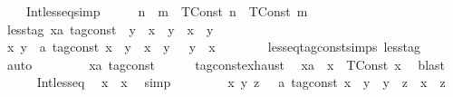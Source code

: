 \begin{isabellebody}
\ \ \ \ Int{\isacharunderscore}less{\isacharunderscore}eq{\isacharbrackleft}simp{\isacharbrackright}{\isacharcolon}\ \ \ \ \ \ {\isacartoucheopen}n\ {\isasymle}\ m\ {\isasymLongrightarrow}\ {\isacharparenleft}TConst\ n{\isacharparenright}\ {\isasymle}\ {\isacharparenleft}TConst\ m{\isacharparenright}{\isacartoucheclose}\isanewline
\isanewline
\ \ \isamarkupfalse%
\ less{\isacharunderscore}tag{\isacharcolon}\ {\isacartoucheopen}{\isacharparenleft}x{\isacharcolon}{\isacharcolon}{\isacharprime}a\ tag{\isacharunderscore}const{\isacharparenright}\ {\isacharless}\ y\ {\isasymlongleftrightarrow}\ {\isacharparenleft}x\ {\isasymle}\ y{\isacharparenright}\ {\isasymand}\ {\isacharparenleft}x\ {\isasymnoteq}\ y{\isacharparenright}{\isacartoucheclose}\isanewline
\isanewline
\ \ \isamarkupfalse%
%
\isadelimproof
\ %
\endisadelimproof
%
\isatagproof
{}\isamarkupfalse%
\isanewline
\ \ \ \ \isamarkupfalse%
\ {\isacartoucheopen}{\isasymAnd}x\ y\ {\isacharcolon}{\isacharcolon}\ {\isacharprime}a\ tag{\isacharunderscore}const{\isachardot}\ {\isacharparenleft}x\ {\isacharless}\ y{\isacharparenright}\ {\isacharequal}\ {\isacharparenleft}x\ {\isasymle}\ y\ {\isasymand}\ {\isasymnot}\ y\ {\isasymle}\ x{\isacharparenright}{\isacartoucheclose}\isanewline
\ \ \ \ \ \ \isamarkupfalse%
\ less{\isacharunderscore}eq{\isacharunderscore}tag{\isacharunderscore}const{\isachardot}simps\ less{\isacharunderscore}tag\ \isamarkupfalse%
\ auto\isanewline
\ \ \isamarkupfalse%
\isanewline
\ \ \ \ \isamarkupfalse%
\ x{\isacharcolon}{\isacharcolon}{\isacartoucheopen}{\isacharprime}a\ tag{\isacharunderscore}const{\isacartoucheclose}\isanewline
\ \ \ \ \isamarkupfalse%
\ tag{\isacharunderscore}const{\isachardot}exhaust\ \isamarkupfalse%
\ xa\ \ {\isacartoucheopen}x\ {\isacharequal}\ TConst\ x\ \isamarkupfalse%
\ blast\isanewline
\ \ \ \ \isamarkupfalse%
\ Int{\isacharunderscore}less{\isacharunderscore}eq\ \isamarkupfalse%
\ {\isacartoucheopen}x\ {\isasymle}\ x{\isacartoucheclose}\ \isamarkupfalse%
\ simp\isanewline
\ \ \isamarkupfalse%
\isanewline
\ \ \ \ \isamarkupfalse%
\ {\isacartoucheopen}{\isasymAnd}x\ y\ z\ \ {\isacharcolon}{\isacharcolon}\ {\isacharprime}a\ tag{\isacharunderscore}const{\isachardot}\ x\ {\isasymle}\ y\ {\isasymLongrightarrow}\ y\ {\isasymle}\ z\ {\isasymLongrightarrow}\ x\ {\isasymle}\ z{\isacartoucheclose}\isanewline

\end{isabellebody}
